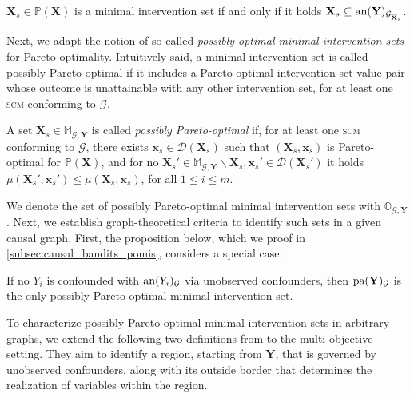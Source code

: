 \begin{proposition}\label{prop:causal_bandits.mis}
    $\mathbf{X}_s \in \mathbb{P}(\mathbf{X})$ is a minimal intervention set if and only if it holds $\mathbf{X}_s \subseteq \textnormal{an}(\mathbf{Y})_{\mathcal{G}_{\overline{\mathbf{X}}_s}}$.
\end{proposition}

Next, we adapt the notion of so called \textit{possibly-optimal minimal intervention sets} \cite{NEURIPS2018_c0a271bc} for Pareto-optimality. Intuitively said, a minimal intervention set is called possibly Pareto-optimal if it includes a Pareto-optimal intervention set-value pair whose outcome is unattainable with any other intervention set, for at least one \textsc{scm} conforming to $\mathcal{G}$.

\begin{definition}\label{def:causal_bandits.pomis}
    A set $\mathbf{X}_s \in \mathbb{M}_{\mathcal{G},\mathbf{Y}}$ is called \textit{possibly Pareto-optimal} if, for at least one \textsc{scm} conforming to $\mathcal{G}$, there exists $\mathbf{x}_s \in \mathcal{D}(\mathbf{X}_s)$ such that $(\mathbf{X}_s,\mathbf{x}_s)$ is Pareto-optimal for $\mathbb{P}(\mathbf{X})$, and for no $\mathbf{X}_s' \in \mathbb{M}_{\mathcal{G},\mathbf{Y}} \backslash \mathbf{X}_s, \mathbf{x}_s' \in \mathcal{D}(\mathbf{X}_s')$ it holds $\mu(\mathbf{X}_s',\mathbf{x}_s') \leq \mu(\mathbf{X}_s,\mathbf{x}_s)$, for all $1\leq i \leq m$.
\end{definition}

We denote the set of possibly Pareto-optimal minimal intervention sets with $\mathbb{O}_{\mathcal{G},\mathbf{Y}}$. 
Next, we establish graph-theoretical criteria to identify such sets in a given causal graph. First, the proposition below, which we proof in \cref{subsec:causal_bandits_pomis}, considers a special case:

\begin{proposition}\label{prop:causal_bandits.pomis_no_confounders}
    If no $Y_i$ is confounded with $\textnormal{an}(Y_i)_{\mathcal{G}}$ via unobserved confounders, then $\textnormal{pa}(\mathbf{Y})_{\mathcal{G}}$ is the only possibly Pareto-optimal minimal intervention set.
\end{proposition}

To characterize possibly Pareto-optimal minimal intervention sets in arbitrary graphs, we extend the following two definitions from \citet{NEURIPS2018_c0a271bc} to the multi-objective setting. They aim to identify a region, starting from $\mathbf{Y}$, that is governed by unobserved confounders, along with its outside border that determines the realization of variables within the region.

